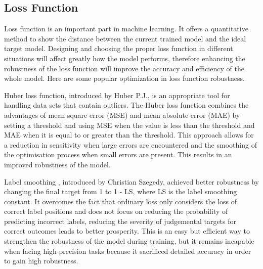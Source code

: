 \documentclass{article}
\begin{document}
\subsection{Loss Function}

Loss function is an important part in machine learning. It offers a quantitative method to show the distance between the current trained model and the ideal target model. Designing and choosing the proper loss function in different situations will affect greatly how the model performs,  therefore enhancing the robustness of the loss function will improve the accuracy and efficiency of the whole model. Here are some popular optimization in loss function robustness.

Huber loss function\cite{huber2011robust}, introduced by Huber P.J., is an appropriate tool for handling data sets that contain outliers. The Huber loss function combines the advantages of mean square error (MSE) and mean absolute error (MAE) by setting a threshold and using MSE when the value is less than the threshold and MAE when it is equal to or greater than the threshold. This approach allows for a reduction in sensitivity when large errors are encountered and the smoothing of the optimisation process when small errors are present. This results in an improved robustness of the model.

Label smoothing \cite{szegedy2015rethinkinginceptionarchitecturecomputer}, introduced by Christian Szegedy, achieved better robustness by changing the final target from 1 to 1 - LS, where LS is the label smoothing constant. It overcomes the fact that ordinary loss only considers the loss of correct label positions and does not focus on reducing the probability of predicting incorrect labels, reducing the severity of judgemental targets for correct outcomes leads to better prosperity. This is an easy but efficient way to strengthen the robustness of the model during training, but it remains incapable when facing high-precision tasks because it sacrificed detailed accuracy in order to gain high robustness.
\end{document}
